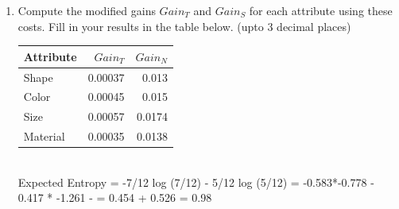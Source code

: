 \documentclass[12pt, fullpage,letterpaper]{article}
\begin{document}
\begin{enumerate}
\item \relax[8 points] Compute the modified gains $Gain_T$ and $Gain_S$ for each
  attribute using these costs. Fill in your results in the table
  below. (upto 3 decimal places)
  \begin{center}
    \begin{tabular}{l|rr}
      Attribute & $Gain_T$ & $Gain_N$ \\\hline
      Shape     & 0.00037  & 0.013    \\
      Color     & 0.00045  & 0.015    \\
      Size      & 0.00057  & 0.0174   \\
      Material  & 0.00035  & 0.0138   \\\hline
    \end{tabular}
  \end{center}
~\\
Expected Entropy = -7/12 log (7/12) - 5/12 log (5/12) = -0.583*-0.778 - 0.417 * -1.261 - = 0.454 + 0.526 = 0.98


\end{enumerate}
\end{document}
